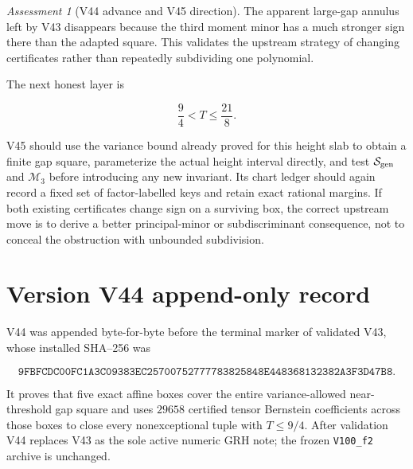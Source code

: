 \documentclass[11pt]{article}
\theoremstyle{definition}
\theoremstyle{remark}
\newtheorem{assessment}[theorem]{Assessment}
\begin{document}
\begin{assessment}[V44 advance and V45 direction]
\label{ass:f2v44}
The apparent large-gap annulus left by V43 disappears because the third
moment minor has a much stronger sign there than the adapted square.
This validates the upstream strategy of changing certificates rather
than repeatedly subdividing one polynomial.

The next honest layer is

\[
 \frac94<T\leq\frac{21}{8}.
\tag{N44.15}
\]

V45 should use the variance bound already proved for this height slab
to obtain a finite gap square, parameterize the actual height interval
directly, and test \(\mathcal S_{\rm gen}\) and \(\mathcal M_3\) before
introducing any new invariant.  Its chart ledger should again record a
fixed set of factor-labelled keys and retain exact rational margins.
If both existing certificates change sign on a surviving box, the
correct upstream move is to derive a better principal-minor or
subdiscriminant consequence, not to conceal the obstruction with
unbounded subdivision.
\end{assessment}

\section*{Version V44 append-only record}

V44 was appended byte-for-byte before the terminal marker of validated
V43, whose installed SHA--256 was

\[
 \texttt{9FBFCDC00FC1A3C09383EC25700752777}
 \allowbreak\texttt{783825848E448368132382A3F3D47B8}.
\tag{N44.16}
\]

It proves that five exact affine boxes cover the entire variance-allowed
near-threshold gap square and uses \(29658\) certified tensor Bernstein
coefficients across those boxes to close every nonexceptional tuple with
\(T\leq9/4\).  After validation V44 replaces V43 as the sole active
numeric GRH note; the frozen \texttt{V100\_f2} archive is unchanged.



\end{document}
